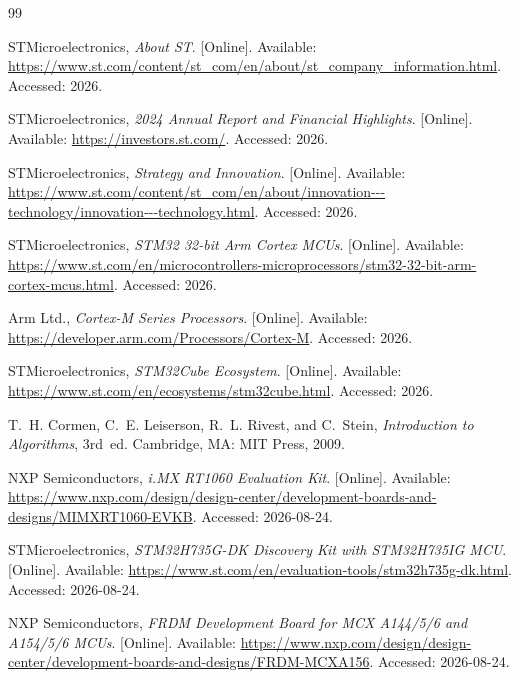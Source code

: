 \documentclass[12pt,a4paper,oneside]{book}
\begin{document}
\begin{thebibliography}{99}


STMicroelectronics, \emph{About ST}. [Online]. Available: \url{https://www.st.com/content/st_com/en/about/st_company_information.html}. Accessed: 2026.

STMicroelectronics, \emph{2024 Annual Report and Financial Highlights}. [Online]. Available: \url{https://investors.st.com/}. Accessed: 2026.

STMicroelectronics, \emph{Strategy and Innovation}. [Online]. Available: \url{https://www.st.com/content/st_com/en/about/innovation---technology/innovation---technology.html}. Accessed: 2026.

STMicroelectronics, \emph{STM32 32-bit Arm Cortex MCUs}. [Online]. Available: \url{https://www.st.com/en/microcontrollers-microprocessors/stm32-32-bit-arm-cortex-mcus.html}. Accessed: 2026.

Arm Ltd., \emph{Cortex-M Series Processors}. [Online]. Available: \url{https://developer.arm.com/Processors/Cortex-M}. Accessed: 2026.

STMicroelectronics, \emph{STM32Cube Ecosystem}. [Online]. Available: \url{https://www.st.com/en/ecosystems/stm32cube.html}. Accessed: 2026.

T.~H. Cormen, C.~E. Leiserson, R.~L. Rivest, and C.~Stein, \emph{Introduction to Algorithms}, 3rd~ed. Cambridge, MA: MIT Press, 2009.


NXP Semiconductors, \emph{i.MX RT1060 Evaluation Kit}. [Online]. Available: \url{https://www.nxp.com/design/design-center/development-boards-and-designs/MIMXRT1060-EVKB}. Accessed: 2026-08-24.

STMicroelectronics, \emph{STM32H735G-DK Discovery Kit with STM32H735IG MCU}. [Online]. Available: \url{https://www.st.com/en/evaluation-tools/stm32h735g-dk.html}. Accessed: 2026-08-24.

NXP Semiconductors, \emph{FRDM Development Board for MCX A144/5/6 and A154/5/6 MCUs}. [Online]. Available: \url{https://www.nxp.com/design/design-center/development-boards-and-designs/FRDM-MCXA156}. Accessed: 2026-08-24.


\end{thebibliography}
\end{document}
